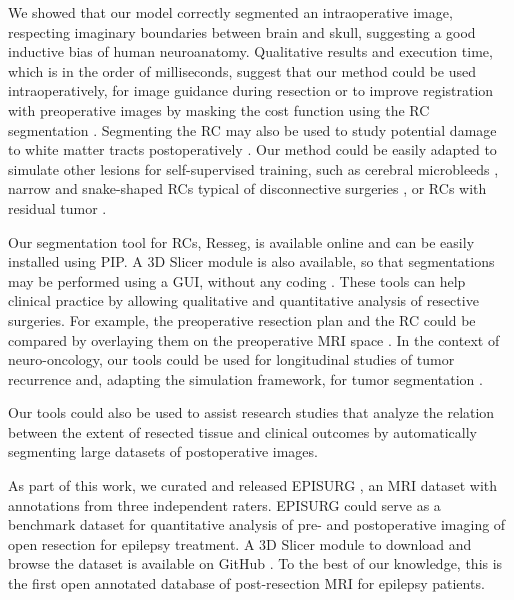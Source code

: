 We showed that our model correctly segmented an intraoperative image, respecting imaginary boundaries between brain and skull, suggesting a good inductive bias of human neuroanatomy.
Qualitative results and execution time, which is in the order of milliseconds, suggest that our method could be used intraoperatively, for image guidance during resection or to improve registration with preoperative images by masking the cost function using the \ac{RC} segmentation \cite{brett_spatial_2001}.
Segmenting the \ac{RC} may also be used to study potential damage to white matter tracts postoperatively \cite{winston_optic_2012}.
Our method could be easily adapted to simulate other lesions for self-supervised training, such as cerebral microbleeds \cite{cuadrado-godia_cerebral_2018}, narrow and snake-shaped \acp{RC} typical of disconnective surgeries \cite{mohamed_temporoparietooccipital_2011}, or \acp{RC} with residual tumor \cite{meier_automatic_2017}.

Our segmentation tool for \acp{RC}, Resseg, is available online%
and can be easily installed using \ac{PIP}.
A 3D Slicer module is also available, so that segmentations may be performed using a \ac{GUI}, without any coding%
.
These tools can help clinical practice by allowing qualitative and quantitative analysis of resective surgeries.
For example, the preoperative resection plan and the \ac{RC} could be compared by overlaying them on the preoperative \ac{MRI} space \cite{nowell_utility_2015,nowell_resection_2017}.
In the context of neuro-oncology, our tools could be used for longitudinal studies of tumor recurrence \cite{meier_automatic_2017} and, adapting the simulation framework, for tumor segmentation \cite{zhang_self-supervised_2021}.

Our tools could also be used to assist research studies that analyze the relation between the extent of resected tissue and clinical outcomes \cite{taylor_impact_2018,galovic_association_2019} by automatically segmenting large datasets of postoperative images.

As part of this work, we curated and released EPISURG \cite{perez-garcia_episurg_2020}, an \ac{MRI} dataset with annotations from three independent raters.
EPISURG could serve as a benchmark dataset for quantitative analysis of pre- and postoperative imaging of open resection for epilepsy treatment.
A 3D Slicer module to download and browse the dataset is available on GitHub%
.
To the best of our knowledge, this is the first open annotated database of post-resection \ac{MRI} for epilepsy patients.
